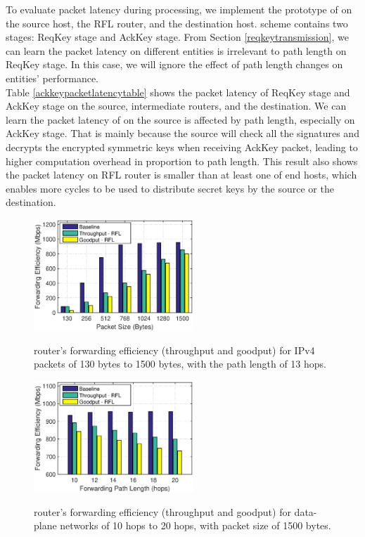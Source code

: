 To evaluate packet latency during \namekey{} processing, we implement the prototype of \namekey{} on the source host, the RFL router, and the destination host. \namekey{} scheme contains two stages: ReqKey stage and AckKey stage. From Section \ref{reqkeytransmission}, we can learn the packet latency on different entities is irrelevant to path length on ReqKey stage. In this case, we will ignore the effect of path length changes on entities' performance. \\
\indent Table \ref{ackkeypacketlatencytable} shows the packet latency of ReqKey stage and AckKey stage on the source, intermediate routers, and the destination. We can learn the packet latency of \namekey{} on the source is affected by path length, especially on AckKey stage. That is mainly because the source will check all the signatures and decrypts the encrypted symmetric keys when receiving AckKey packet, leading to higher computation overhead in proportion to path length. This result also shows the packet latency on RFL router is smaller than at least one of end hosts, which enables more cycles to be used to distribute secret keys by the source or the destination. 
\iffalse
\begin{figure}%
  \centering
  \includegraphics[width=6cm]{code_matlab/throughput2_spmoni.eps}\\
  \caption{\name{} router's forwarding efficiency (throughput and goodput) for IPv4 packets of 130 bytes to 1500 bytes, with the path length of 13 hops.}\label{packetsize}
\end{figure}
\begin{figure}%
  \centering
  \includegraphics[width=6cm]{code_matlab/throughput_pathlength_spmoni2.eps}\\
  \caption{\name{} router's forwarding efficiency (throughput and goodput) for data-plane networks of 10 hops to 20 hops, with packet size of 1500 bytes.}\label{pathlength}
\end{figure}
